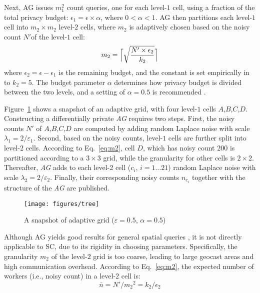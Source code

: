 \documentclass{USC-Thesis}
\DeclarePairedDelimiter{\ceil}{\lceil}{\rceil}
\numberwithin{equation}{chapter}
\begin{document}
Next, AG issues $m_1^2$ count queries, one for each level-$1$ cell, using a fraction of the total privacy budget: $\epsilon_1 = \epsilon \times \alpha$, where $0<\alpha<1$. AG then partitions each level-$1$ cell into $m_2\times m_2$ level-$2$ cells, where $m_2$ is adaptively chosen based on the noisy count $N'$of the level-$1$ cell:
\begin{equation}
m_2=\ceil[\Big] {\sqrt{{\frac{N' \times \epsilon_2}{k_2}}}}
\label{eq:m2}
\end{equation}
where $\epsilon_2 = \epsilon - \epsilon_1$ is the remaining budget, and the constant is set empirically in \cite{qardaji2012differentially} to $k_2=5$. The budget parameter $\alpha$ determines how privacy budget is divided between the two levels, and a setting of  $\alpha = 0.5$ is recommended \cite{qardaji2012differentially}.

Figure~\ref{fig:AG} shows a snapshot of an adaptive grid, with four level-$1$ cells $A$,$B$,$C$,$D$. Constructing a differentially private {\em AG} requires two steps. First, the noisy counts $N'$ of $A$,$B$,$C$,$D$ are computed by adding random Laplace noise with scale $\lambda_1=2/\varepsilon_1$. Second, based on the noisy counts, level-$1$ cells are further split into level-$2$ cells. According to Eq.~\eqref{eq:m2}, cell $D$, which has noisy count $200$ is partitioned according to a $3 \times 3$ grid, while the granularity for other cells is $2 \times 2$. Thereafter, {\em AG} adds to each level-2 cell ($c_i$, $i=1\ldots 21$) random Laplace noise with scale $\lambda_2=2/\varepsilon_2$. Finally, their corresponding noisy counts $n_{c_i}$ together with the structure of the {\em AG} are published.

\begin{figure}[!ht]
	\centering
		\texttt{[image: figures/tree]}
	\caption{A snapshot of adaptive grid ($\varepsilon=0.5$, $\alpha = 0.5$)}
\label{fig:AG}
\end{figure}

Although AG yields good results for general spatial queries \cite{qardaji2012differentially}, it is not directly applicable to SC, due to its rigidity in choosing parameters. Specifically, the granularity $m_2$ of the level-$2$ grid is too coarse, leading to large geocast areas and high communication overhead. According to Eq.~\eqref{eq:m2}, the expected number of workers (i.e., noisy count) in a level-$2$ cell is: 
$$\bar{n}=N'/{m_2}^2=k_2/\epsilon_2$$
\end{document}
